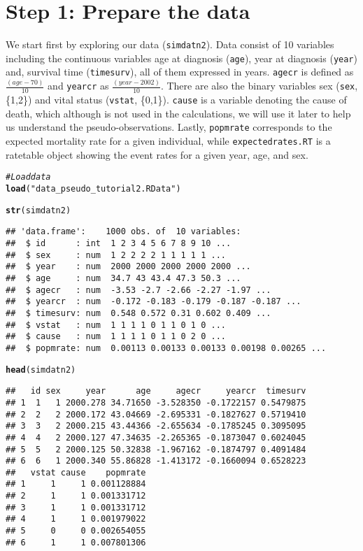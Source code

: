 \documentclass[a4paper,11pt]{article}\usepackage[]{graphicx}\usepackage[]{color}
\makeatletter
\newcommand{\hlstr}[1]{\textcolor[rgb]{0.192,0.494,0.8}{#1}}%
\newcommand{\hlcom}[1]{\textcolor[rgb]{0.678,0.584,0.686}{\textit{#1}}}%
\newcommand{\hlstd}[1]{\textcolor[rgb]{0.345,0.345,0.345}{#1}}%
\newcommand{\hlkwd}[1]{\textcolor[rgb]{0.737,0.353,0.396}{\textbf{#1}}}%
\newenvironment{kframe}{%
 \def\at@end@of@kframe{}%
 \ifinner\ifhmode%
  \def\at@end@of@kframe{\end{minipage}}%
  \begin{minipage}{\columnwidth}%
 \fi\fi%
 \def\FrameCommand##1{\hskip\@totalleftmargin \hskip-\fboxsep
 \colorbox{shadecolor}{##1}\hskip-\fboxsep
     \hskip-\linewidth \hskip-\@totalleftmargin \hskip\columnwidth}%
 \MakeFramed {\advance\hsize-\width
   \@totalleftmargin\z@ \linewidth\hsize
   \@setminipage}}%
 {\par\unskip\endMakeFramed%
 \at@end@of@kframe}
\newenvironment{knitrout}{}{} %
\makeatother
\begin{document}
\section{Step 1: Prepare the data}
We start first by exploring our data (\texttt{simdatn2}). Data consist of 10 variables including the continuous variables age at diagnosis (\texttt{age}), year at diagnosis (\texttt{year}) and, survival time (\texttt{timesurv}), all of them expressed in years. \texttt{agecr} is defined as $\frac{(age-70)}{10}$ and \texttt{yearcr} as $\frac{(year-2002)}{10}$. There are also the binary variables sex (\texttt{sex}, \{1,2\}) and vital status (\texttt{vstat}, \{0,1\}). \texttt{cause} is a variable denoting the cause of death, which although is not used in the calculations, we will use it later to help us understand the pseudo-observations. Lastly, \texttt{popmrate} corresponds to the expected mortality rate for a given individual, while \texttt{expectedrates.RT} is a ratetable object showing the event rates for a given year, age, and sex. 

\begin{knitrout}
\color{fgcolor}\begin{kframe}
\begin{alltt}
\hlcom{# Load data}
\hlkwd{load}\hlstd{(}\hlstr{"data_pseudo_tutorial2.RData"}\hlstd{)}

\hlkwd{str}\hlstd{(simdatn2)}
\end{alltt}
\begin{verbatim}
## 'data.frame':	1000 obs. of  10 variables:
##  $ id      : int  1 2 3 4 5 6 7 8 9 10 ...
##  $ sex     : num  1 2 2 2 2 1 1 1 1 1 ...
##  $ year    : num  2000 2000 2000 2000 2000 ...
##  $ age     : num  34.7 43 43.4 47.3 50.3 ...
##  $ agecr   : num  -3.53 -2.7 -2.66 -2.27 -1.97 ...
##  $ yearcr  : num  -0.172 -0.183 -0.179 -0.187 -0.187 ...
##  $ timesurv: num  0.548 0.572 0.31 0.602 0.409 ...
##  $ vstat   : num  1 1 1 1 0 1 1 0 1 0 ...
##  $ cause   : num  1 1 1 1 0 1 1 0 2 0 ...
##  $ popmrate: num  0.00113 0.00133 0.00133 0.00198 0.00265 ...
\end{verbatim}
\begin{alltt}
\hlkwd{head}\hlstd{(simdatn2)}
\end{alltt}
\begin{verbatim}
##   id sex     year      age     agecr     yearcr  timesurv
## 1  1   1 2000.278 34.71650 -3.528350 -0.1722157 0.5479875
## 2  2   2 2000.172 43.04669 -2.695331 -0.1827627 0.5719410
## 3  3   2 2000.215 43.44366 -2.655634 -0.1785245 0.3095095
## 4  4   2 2000.127 47.34635 -2.265365 -0.1873047 0.6024045
## 5  5   2 2000.125 50.32838 -1.967162 -0.1874797 0.4091484
## 6  6   1 2000.340 55.86828 -1.413172 -0.1660094 0.6528223
##   vstat cause    popmrate
## 1     1     1 0.001128884
## 2     1     1 0.001331712
## 3     1     1 0.001331712
## 4     1     1 0.001979022
## 5     0     0 0.002654055
## 6     1     1 0.007801306
\end{verbatim}
\end{kframe}
\end{knitrout}
\end{document}
